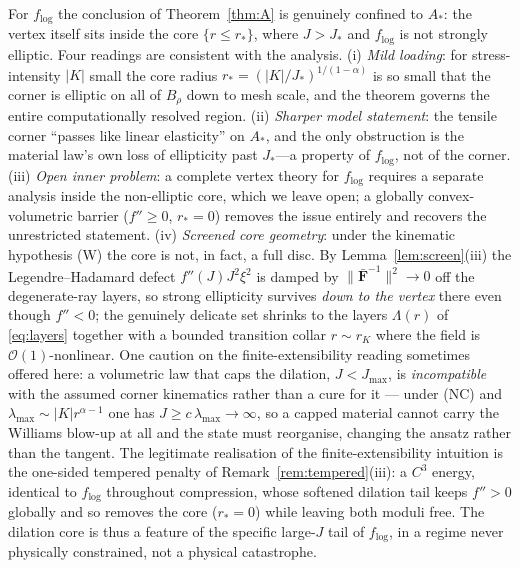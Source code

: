 \begin{remark}
    \label{rem:core}
    For $f_{\log}$ the conclusion of Theorem~\ref{thm:A} is genuinely confined to $A_*$: the vertex itself sits inside the
    core $\{r\le r_*\}$, where $J>J_*$ and $f_{\log}$ is not strongly elliptic. Four readings are consistent with the
    analysis. (i) \emph{Mild loading}: for stress-intensity $|K|$ small the core radius $r_*=(|K|/J_*)^{1/(1-\alpha)}$ is
    so small that the corner is elliptic on all of $B_\rho$ down to mesh scale, and the theorem governs the entire
    computationally resolved region. (ii) \emph{Sharper model statement}: the tensile corner ``passes like linear
    elasticity'' on $A_*$, and the only obstruction is the material law's own loss of ellipticity past $J_*$---a property
    of $f_{\log}$, not of the corner. (iii) \emph{Open inner problem}: a complete vertex theory for $f_{\log}$ requires a
    separate analysis inside the non-elliptic core, which we leave open; a globally convex-volumetric barrier
    ($f''\ge0$, $r_*=0$) removes the issue entirely and recovers the unrestricted statement. (iv) \emph{Screened core
    geometry}: under the kinematic hypothesis (W) the core is not, in fact, a full disc. By Lemma~\ref{lem:screen}(iii)
    the Legendre--Hadamard defect $f''(J)J^2\xi^2$ is damped by $\|\bar{\bm F}^{-1}\|^2\to0$ off the degenerate-ray
    layers, so strong ellipticity survives \emph{down to the vertex} there even though $f''<0$; the genuinely delicate
    set shrinks to the layers $\Lambda(r)$ of \eqref{eq:layers} together with a bounded transition collar $r\sim r_K$
    where the field is $\mathcal{O}(1)$-nonlinear. One caution on the finite-extensibility reading sometimes offered
    here: a volumetric law that caps the dilation, $J<J_{\max}$, is \emph{incompatible} with the assumed corner
    kinematics rather than a cure for it --- under (NC) and $\lambda_{\max}\sim|K|r^{\alpha-1}$ one has
    $J\ge c\,\lambda_{\max}\to\infty$, so a capped material cannot carry the Williams blow-up at all and the state
    must reorganise, changing the ansatz rather than the tangent. The legitimate realisation of the
    finite-extensibility intuition is the one-sided tempered penalty of Remark~\ref{rem:tempered}(iii): a $C^3$
    energy, identical to $f_{\log}$ throughout compression, whose softened dilation tail keeps $f''>0$ globally and
    so removes the core ($r_*=0$) while leaving both moduli free. The dilation core is thus a feature of the specific
    large-$J$ tail of $f_{\log}$, in a regime never physically constrained, not a physical catastrophe.
\end{remark}

